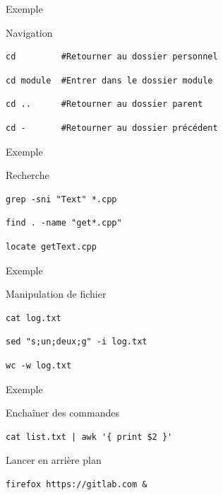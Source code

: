 \documentclass{beamer}
\begin{document}
\begin{frame}[fragile]{Exemple}
\begin{block}{Navigation}
\begin{verbatim}
cd         #Retourner au dossier personnel
\end{verbatim}
\begin{verbatim}
cd module  #Entrer dans le dossier module
\end{verbatim}
\begin{verbatim}
cd ..      #Retourner au dossier parent
\end{verbatim}
\begin{verbatim}
cd -       #Retourner au dossier précédent
\end{verbatim}
\end{block}
\end{frame}



\begin{frame}[fragile]{Exemple}
\begin{block}{Recherche}
\begin{verbatim}
grep -sni "Text" *.cpp
\end{verbatim}
\begin{verbatim}
find . -name "get*.cpp"
\end{verbatim}
\begin{verbatim}
locate getText.cpp
\end{verbatim}
\end{block}
\end{frame}


\begin{frame}[fragile]{Exemple}
\begin{block}{Manipulation de fichier}
\begin{verbatim}
cat log.txt
\end{verbatim}
\begin{verbatim}
sed "s;un;deux;g" -i log.txt
\end{verbatim}
\begin{verbatim}
wc -w log.txt
\end{verbatim}
\end{block}
\end{frame}

\begin{frame}[fragile]{Exemple}
\begin{block}{Enchaîner des commandes}
\begin{verbatim}
cat list.txt | awk '{ print $2 }'
\end{verbatim}
\end{block}
\begin{block}{Lancer en arrière plan}
\begin{verbatim}
firefox https://gitlab.com &
\end{verbatim}
\end{block}
\end{frame}
\end{document}
